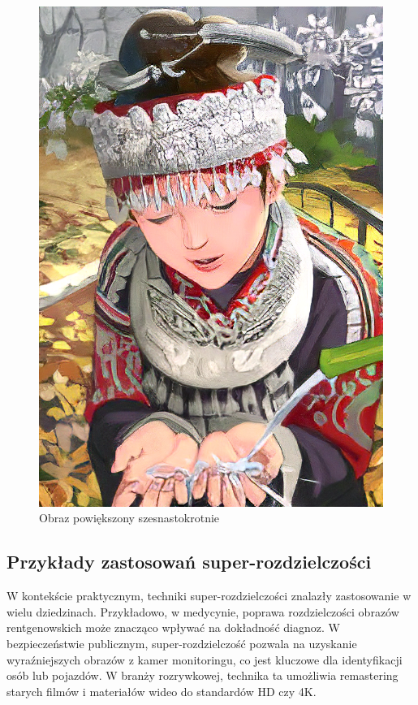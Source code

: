 \begin{figure}[ht]
\begin{minipage}[t]{0.3\linewidth}
        \includegraphics[width=\linewidth]{Rozdziały/02.Podstawy_teoretyczne/comic_ESRGAN_x16.png}
        \caption{Obraz powiększony szesnastokrotnie}
        \label{fig:image3}
    \end{minipage}
\end{figure}

\subsection*{Przykłady zastosowań super-rozdzielczości}

W kontekście praktycznym, techniki super-rozdzielczości znalazły zastosowanie w wielu dziedzinach. Przykładowo, w medycynie, poprawa rozdzielczości obrazów rentgenowskich może znacząco wpływać na dokładność diagnoz. W bezpieczeństwie publicznym, super-rozdzielczość pozwala na uzyskanie wyraźniejszych obrazów z kamer monitoringu, co jest kluczowe dla identyfikacji osób lub pojazdów. W branży rozrywkowej, technika ta umożliwia remastering starych filmów i materiałów wideo do standardów HD czy 4K.

